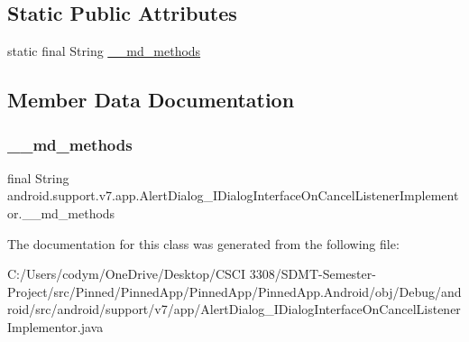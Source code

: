 \subsection*{Static Public Attributes}
\begin{DoxyCompactItemize}
\item 
static final String \hyperlink{classandroid_1_1support_1_1v7_1_1app_1_1_alert_dialog___i_dialog_interface_on_cancel_listener_implementor_aad0667e101becd304b276b6492f459d1}{\+\_\+\+\_\+md\+\_\+methods}
\end{DoxyCompactItemize}


\subsection{Member Data Documentation}
\mbox{\label{classandroid_1_1support_1_1v7_1_1app_1_1_alert_dialog___i_dialog_interface_on_cancel_listener_implementor_aad0667e101becd304b276b6492f459d1}} 
\subsubsection{\texorpdfstring{\+\_\+\+\_\+md\+\_\+methods}{\_\_md\_methods}}
{\footnotesize\ttfamily final String android.\+support.\+v7.\+app.\+Alert\+Dialog\+\_\+\+I\+Dialog\+Interface\+On\+Cancel\+Listener\+Implementor.\+\_\+\+\_\+md\+\_\+methods\hspace{0.3cm}{\ttfamily [static]}}



The documentation for this class was generated from the following file\+:\begin{DoxyCompactItemize}
\item 
C\+:/\+Users/codym/\+One\+Drive/\+Desktop/\+C\+S\+C\+I 3308/\+S\+D\+M\+T-\/\+Semester-\/\+Project/src/\+Pinned/\+Pinned\+App/\+Pinned\+App/\+Pinned\+App.\+Android/obj/\+Debug/android/src/android/support/v7/app/Alert\+Dialog\+\_\+\+I\+Dialog\+Interface\+On\+Cancel\+Listener\+Implementor.\+java\end{DoxyCompactItemize}
